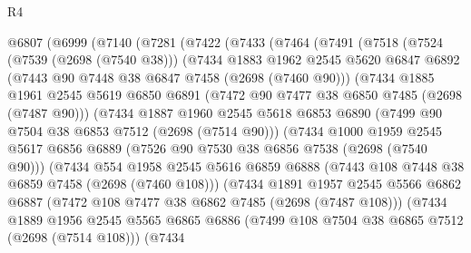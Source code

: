 \begin{lexlean}{R4}
\begin{coremodule}
  @6807
    (@6999
      (@7140
        (@7281
          (@7422
            (@7433
              (@7464
                (@7491
                  (@7518
                    (@7524
                      (@7539 (@2698 (@7540 @38)))
                      (@7434
                        @1883
                        @1962
                        @2545
                        @5620
                        @6847
                        @6892
                        (@7443 @90 @7448 @38 @6847 @7458 (@2698 (@7460 @90)))
                        (@7434
                          @1885
                          @1961
                          @2545
                          @5619
                          @6850
                          @6891
                          (@7472 @90 @7477 @38 @6850 @7485 (@2698 (@7487 @90)))
                          (@7434
                            @1887
                            @1960
                            @2545
                            @5618
                            @6853
                            @6890
                            (@7499 @90 @7504 @38 @6853 @7512 (@2698 (@7514 @90)))
                            (@7434
                              @1000
                              @1959
                              @2545
                              @5617
                              @6856
                              @6889
                              (@7526 @90 @7530 @38 @6856 @7538 (@2698 (@7540 @90)))
                              (@7434
                                @554
                                @1958
                                @2545
                                @5616
                                @6859
                                @6888
                                (@7443 @108 @7448 @38 @6859 @7458 (@2698 (@7460 @108)))
                                (@7434
                                  @1891
                                  @1957
                                  @2545
                                  @5566
                                  @6862
                                  @6887
                                  (@7472 @108 @7477 @38 @6862 @7485 (@2698 (@7487 @108)))
                                  (@7434
                                    @1889
                                    @1956
                                    @2545
                                    @5565
                                    @6865
                                    @6886
                                    (@7499 @108 @7504 @38 @6865 @7512 (@2698 (@7514 @108)))
                                    (@7434

\end{coremodule}
\end{lexlean}
